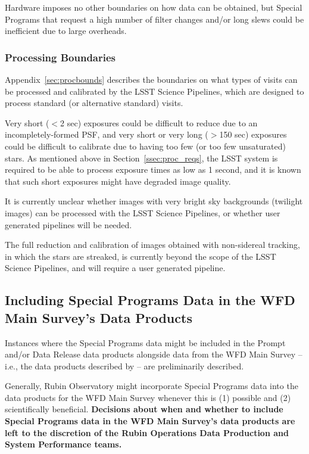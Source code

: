 \documentclass[DM,lsstdoc,toc]{lsstdoc}
\begin{document}
Hardware imposes no other boundaries on how data can be obtained, but Special Programs that request a high number of filter changes and/or long slews could be inefficient due to large overheads.


\subsubsection{Processing Boundaries}

Appendix~\ref{sec:procbounds} describes the boundaries on what types of visits can be processed and calibrated by the LSST Science Pipelines, which are designed to process standard (or alternative standard) visits.

Very short ($<$2 sec) exposures could be difficult to reduce due to an incompletely-formed PSF, and very short or very long ($>$150 sec) exposures could be difficult to calibrate due to having too few (or too few unsaturated) stars.
As mentioned above in Section~\ref{ssec:proc_reqs}, the LSST system is required to be able to process exposure times as low as 1 second, and it is known that such short exposures might have degraded image quality.

It is currently unclear whether images with very bright sky backgrounds (twilight images) can be processed with the LSST Science Pipelines, or whether user generated pipelines will be needed.

The full reduction and calibration of images obtained with non-sidereal tracking, in which the stars are streaked, is currently beyond the scope of the LSST Science Pipelines, and will require a user generated pipeline.




\subsection{Including Special Programs Data in the WFD Main Survey's Data Products}\label{ssec:proc_wfd}

Instances where the Special Programs data might be included in the Prompt and/or Data Release data products alongside data from the WFD Main Survey -- i.e., the data products described by  -- are preliminarily described.

Generally, Rubin Observatory might incorporate Special Programs data into the data products for the WFD Main Survey whenever this is (1) possible and (2) scientifically beneficial.
{\bf Decisions about when and whether to include Special Programs data in the WFD Main Survey's data products are left to the discretion of the Rubin Operations Data Production and System Performance teams.}
\end{document}
